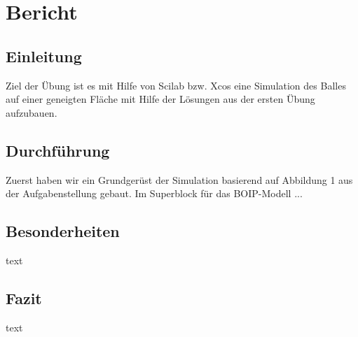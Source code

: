\section{Bericht}

\subsection{Einleitung}
Ziel der Übung ist es mit Hilfe von Scilab bzw. Xcos eine Simulation des Balles auf einer geneigten Fläche mit Hilfe der Lösungen aus der ersten Übung aufzubauen.

\subsection{Durchführung}\begin{center}
\end{center}
Zuerst haben wir ein Grundgerüst der Simulation basierend auf Abbildung 1 aus der Aufgabenstellung gebaut. Im Superblock für das BOIP-Modell ...

\subsection{Besonderheiten}
text

\subsection{Fazit}
text
